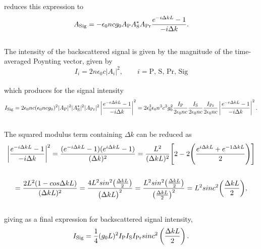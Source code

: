 reduces this expression to
\\
\begin{equation}
  A_{\rm Sig} = -\epsilon_{0}ncg_{0}A_{\rm P}A_{\rm S}^{*}A_{\rm Pr} \frac{e^{-i\Delta kL} - 1}{-i\Delta k}.
\end{equation}
\\
The intensity of the backscattered signal is given by the magnitude of the time-averaged Poynting vector, given by
\\
\begin{equation}
  I_{i} = 2n\epsilon_{0}c|A_{i}|^{2}, \qquad i = \mathrm{P},\,\mathrm{S},\,\mathrm{Pr},\,\mathrm{Sig}
\end{equation}
\\
which produces for the signal intensity
\\
\begin{equation}
  I_{\rm Sig} = 2\epsilon_{0}nc(\epsilon_{0}ncg_{0})^{2}|A_{\rm P}|^{2}|A_{\rm S}^{*}|^{2}|A_{\rm Pr}|^{2}\left|\frac{e^{-e\Delta kL} - 1}{-i\Delta k}\right|^{2}
  = 2\epsilon_{0}^{3}\epsilon_{0}n^{3}c^{3}g_{0}^{2}\frac{I_{\rm P}}{2\epsilon_{0}nc}\frac{I_{\rm S}}{2\epsilon_{0}nc}\frac{I_{\rm Pr}}{2\epsilon_{0}nc}\left|\frac{e^{-e\Delta kL} - 1}{-i\Delta k}\right|^{2}.
\end{equation}
\\
The squared modulus term containing \(\Delta k\) can be reduced as
\\
\begin{gather}
  \bigg|\frac{e^{-i\Delta kL} - 1}{-i\Delta k}\bigg|^{2} = \frac{(e^{-i\Delta kL} - 1)(e^{i\Delta kL} - 1)}{(\Delta k)^{2}} = \frac{L^{2}}{(\Delta kL)^{2}}\Bigg[ 2 - 2\Bigg(\frac{e^{i\Delta kL} + e^{-1\Delta kL}}{2}\Bigg)\Bigg] \notag \\ \notag \\
  = \frac{2L^{2}(1 - cos\Delta kL)}{(\Delta kL)^{2}} = \frac{4L^{2}sin^{2}\big(\frac{\Delta kL}{2}\big)}{\big(\Delta kL\big)^{2}} = \frac{L^{2}sin^{2}\big(\frac{\Delta kL}{2}\big)}{\big(\frac{\Delta kL}{2}\big)^{2}} = L^{2}sinc^{2}\bigg(\frac{\Delta kL}{2}\bigg),
\end{gather}
\\
giving as a final expression for backscattered signal intensity,
\\
\begin{equation}
I_{\rm Sig} = \frac{1}{4}(g_{0}L)^{2}I_{\rm P}I_{\rm S}I_{\rm Pr}sinc^{2}\left(\frac{\Delta kL}{2}\right).
\end{equation}
\\

